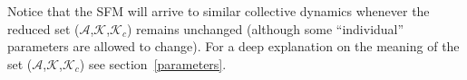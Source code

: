 \documentclass[preprint,12pt]{elsarticle}
\begin{document}
Notice that the SFM will arrive to similar collective dynamics whenever the 
reduced set ($\mathcal{A}$,$\mathcal{K}$,$\mathcal{K}_c$) remains unchanged 
(although some ``individual'' parameters are allowed to change). For a deep 
explanation on the meaning  of the set 
($\mathcal{A}$,$\mathcal{K}$,$\mathcal{K}_c$) see section~\ref{parameters}. \\






\end{document}
